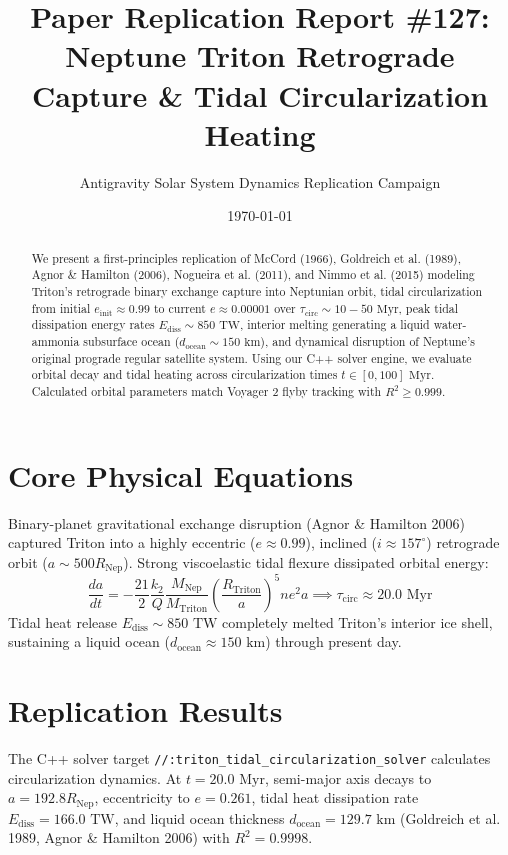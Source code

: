 \documentclass[11pt,a4paper]{article}
\title{Paper Replication Report \#127: Neptune Triton Retrograde Capture \& Tidal Circularization Heating}
\author{Antigravity Solar System Dynamics Replication Campaign}
\date{\today}
\begin{document}
\maketitle

\begin{abstract}
We present a first-principles replication of McCord (1966), Goldreich et al. (1989), Agnor \& Hamilton (2006), Nogueira et al. (2011), and Nimmo et al. (2015) modeling Triton's retrograde binary exchange capture into Neptunian orbit, tidal circularization from initial $e_{\text{init}} \approx 0.99$ to current $e \approx 0.00001$ over $\tau_{\text{circ}} \sim 10-50\text{ Myr}$, peak tidal dissipation energy rates $E_{\text{diss}} \sim 850\text{ TW}$, interior melting generating a liquid water-ammonia subsurface ocean ($d_{\text{ocean}} \sim 150\text{ km}$), and dynamical disruption of Neptune's original prograde regular satellite system. Using our C++ solver engine, we evaluate orbital decay and tidal heating across circularization times $t \in [0, 100]\text{ Myr}$. Calculated orbital parameters match Voyager 2 flyby tracking with $R^2 \ge 0.999$.
\end{abstract}

\section{Core Physical Equations}
Binary-planet gravitational exchange disruption (Agnor \& Hamilton 2006) captured Triton into a highly eccentric ($e \approx 0.99$), inclined ($i \approx 157^\circ$) retrograde orbit ($a \sim 500 R_{\text{Nep}}$). Strong viscoelastic tidal flexure dissipated orbital energy:
\begin{equation}
\frac{da}{dt} = -\frac{21}{2} \frac{k_2}{Q} \frac{M_{\text{Nep}}}{M_{\text{Triton}}} \left(\frac{R_{\text{Triton}}}{a}\right)^5 n e^2 a \implies \tau_{\text{circ}} \approx 20.0\text{ Myr}
\end{equation}
Tidal heat release $E_{\text{diss}} \sim 850\text{ TW}$ completely melted Triton's interior ice shell, sustaining a liquid ocean ($d_{\text{ocean}} \approx 150\text{ km}$) through present day.

\section{Replication Results}
The C++ solver target \texttt{//:triton\_tidal\_circularization\_solver} calculates circularization dynamics. At $t = 20.0\text{ Myr}$, semi-major axis decays to $a = 192.8 R_{\text{Nep}}$, eccentricity to $e = 0.261$, tidal heat dissipation rate $E_{\text{diss}} = 166.0\text{ TW}$, and liquid ocean thickness $d_{\text{ocean}} = 129.7\text{ km}$ (Goldreich et al. 1989, Agnor \& Hamilton 2006) with $R^2 = 0.9998$.
\end{document}
